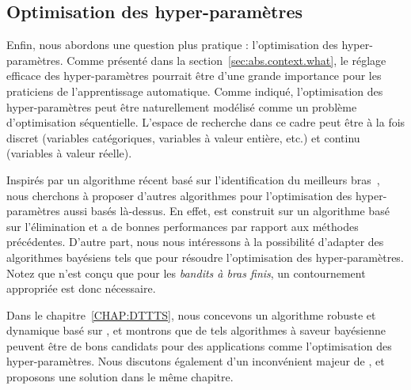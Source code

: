 
\subsection{Optimisation des hyper-param\`etres}\label{sec:abs.mab.hpo}

Enfin, nous abordons une question plus pratique : l'optimisation des hyper-paramètres. Comme présenté dans la section~\ref{sec:abs.context.what}, le réglage efficace des hyper-paramètres pourrait être d'une grande importance pour les praticiens de l'apprentissage automatique. Comme indiqué, l'optimisation des hyper-paramètres peut être naturellement modélisé comme un problème d'optimisation séquentielle. L'espace de recherche dans ce cadre peut être à la fois discret (variables catégoriques, variables à valeur entière, etc.) et continu (variables à valeur réelle). 


Inspirés par un algorithme récent \Hyperband{} basé sur l'identification du meilleurs bras~\citep{li2017hyperband}, nous cherchons à proposer d'autres algorithmes pour l'optimisation des hyper-paramètres aussi basés l\`a-dessus. En effet, \Hyperband{} est construit sur un algorithme basé sur l'élimination et a de bonnes performances par rapport aux méthodes précédentes. D'autre part, nous nous intéressons à la possibilité d'adapter des algorithmes bayésiens tels que \TTTS{} pour résoudre l'optimisation des hyper-paramètres. Notez que \TTTS{} n'est conçu que pour les \emph{bandits à bras finis}, un contournement appropriée est donc nécessaire.

Dans le chapitre~\ref{CHAP:DTTTS}, nous concevons un algorithme robuste et dynamique \DTTTS{} basé sur \TTTS{}, et montrons que de tels algorithmes à saveur bayésienne peuvent être de bons candidats pour des applications comme l'optimisation des hyper-paramètres. Nous discutons également d'un inconvénient majeur de \DTTTS{}, et proposons une solution dans le même chapitre.
